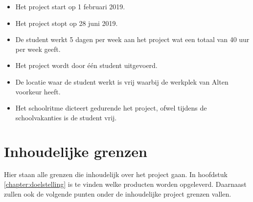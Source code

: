 \documentclass[a4paper, 11pt, oneside]{report}
\begin{document}
\begin{itemize}
	\item Het project start op 1 februari 2019.
	\item Het project stopt op 28 juni 2019.
	\item De student werkt 5 dagen per week aan het project wat een totaal van 40 uur per week geeft.
	\item Het project wordt door één student uitgevoerd.
	\item De locatie waar de student werkt is vrij waarbij de werkplek van Alten voorkeur heeft.
	\item Het schoolritme dicteert gedurende het project, ofwel tijdens de schoolvakanties is de student vrij.
\end{itemize}

\section{Inhoudelijke grenzen}
Hier staan alle grenzen die inhoudelijk over het project gaan. In hoofdstuk \ref{chapter:doelstelling} is te vinden welke producten worden opgeleverd. Daarnaast zullen ook de volgende punten onder de inhoudelijke project grenzen vallen.
\end{document}
